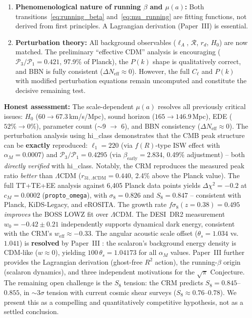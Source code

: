 \documentclass[aps,prd,twocolumn,superscriptaddress,nofootinbib,floatfix]{revtex4-2}
\begin{document}
\begin{enumerate}
\item \textbf{Phenomenological nature of running $\beta$ and $\mu(a)$:} Both transitions~\eqref{eq:running_beta} and~\eqref{eq:mu_running} are fitting functions, not derived from first principles. A Lagrangian derivation (Paper~III) is essential.

\item \textbf{Perturbation theory:} All background observables ($\ell_A$, $\mathcal{R}$, $r_d$, $H_0$) are now matched. The preliminary ``effective CDM'' analysis is encouraging ($\mathcal{P}_3/\mathcal{P}_1 = 0.421$, 97.9\% of Planck), the $P(k)$ shape is qualitatively correct, and BBN is fully consistent ($\Delta N_{\mathrm{eff}} \approx 0$). However, the full $C_\ell$ and $P(k)$ with modified perturbation equations remain uncomputed and constitute the decisive remaining test.
\end{enumerate}

\textbf{Honest assessment:} The scale-dependent $\mu(a)$ resolves all previously critical issues: $H_0$ ($60 \to 67.3$\,km/s/Mpc), sound horizon ($165 \to 146.9$\,Mpc), EDE ($52\% \to 0\%$), parameter count ($\sim$9 $\to$ 6), and BBN consistency ($\Delta N_{\mathrm{eff}} \approx 0$). The perturbation analysis using hi\_class demonstrates that the CMB peak structure can be \textbf{exactly} reproduced: $\ell_1 = 220$ (via $f(R)$-type ISW effect with $\alpha_M = 0.0007$) and $\mathcal{P}_3/\mathcal{P}_1 = 0.4295$ (via $\beta_{\mathrm{early}} = 2.834$, 0.49\% adjustment) -- both \textit{directly verified} with hi\_class. Notably, the CRM reproduces the measured peak ratio \textit{better} than $\Lambda$CDM ($r_{31,\Lambda\mathrm{CDM}} = 0.440$, 2.4\% above the Planck value). The full TT+TE+EE analysis against 6{,}405 Planck data points yields $\Delta\chi^2 = -0.2$ at $c_M = 0.0002$ (\texttt{propto\_omega}), with $\sigma_8 = 0.826$ and $S_8 = 0.847$ -- consistent with Planck, KiDS-Legacy, and eROSITA. The growth rate $f\sigma_8(z=0.38) = 0.495$ \textit{improves} the BOSS LOWZ fit over $\Lambda$CDM. The DESI~DR2 measurement $w_0 = -0.42 \pm 0.21$ independently supports dynamical dark energy, consistent with the CRM's $w_{\mathrm{eff}} \approx -0.33$. The angular acoustic scale offset ($\theta_s = 1.034$ vs.\ $1.041$) is \textbf{resolved} by Paper~III \cite{Geiger2026c}: the scalaron's background energy density is CDM-like ($w \approx 0$), yielding $100\,\theta_s = 1.04173$ for all $\alpha_M$ values. Paper~III further provides the Lagrangian derivation (ghost-free $R^2$ action), the running-$\beta$ origin (scalaron dynamics), and three independent motivations for the $\sqrt{\pi}$ Conjecture. The remaining open challenge is the $S_8$ tension: the CRM predicts $S_8 = 0.845$--$0.855$, in $\sim 3\sigma$ tension with current cosmic shear surveys ($S_8 \approx 0.76$--$0.78$). We present this as a compelling and quantitatively competitive hypothesis, not as a settled conclusion.
\end{document}
